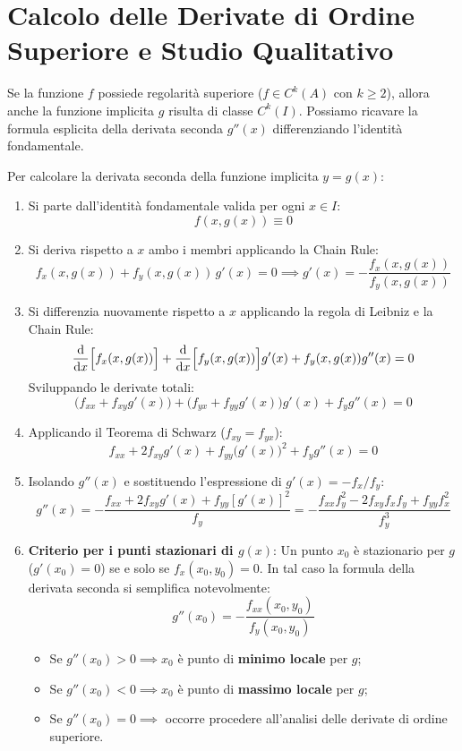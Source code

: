\section{Calcolo delle Derivate di Ordine Superiore e Studio Qualitativo}

Se la funzione $f$ possiede regolarità superiore ($f \in C^k(A)$ con $k \ge 2$), allora anche la funzione implicita $g$ risulta di classe $C^k(I)$. Possiamo ricavare la formula esplicita della derivata seconda $g''(x)$ differenziando l'identità fondamentale.

\begin{metodo}
Per calcolare la derivata seconda della funzione implicita $y = g(x)$:
\begin{enumerate}
    \item Si parte dall'identità fondamentale valida per ogni $x \in I$:
    \[
    f(x, g(x)) \equiv 0
    \]
    \item Si deriva rispetto a $x$ ambo i membri applicando la Chain Rule:
    \[
    f_x(x, g(x)) + f_y(x, g(x)) \, g'(x) = 0 \implies g'(x) = -\frac{f_x(x, g(x))}{f_y(x, g(x))}
    \]
    \item Si differenzia nuovamente rispetto a $x$ applicando la regola di Leibniz e la Chain Rule:
    \[
    \frac{\mathop{}\!\mathrm{d} }{\mathop{}\!\mathrm{d} x} \Big[ f_x(x, g(x)) \Big] + \frac{\mathop{}\!\mathrm{d} }{\mathop{}\!\mathrm{d} x} \Big[ f_y(x, g(x)) \Big] g'(x) + f_y(x, g(x)) g''(x) = 0
    \]
    Sviluppando le derivate totali:
    \[
    \Big( f_{xx} + f_{xy} g'(x) \Big) + \Big( f_{yx} + f_{yy} g'(x) \Big) g'(x) + f_y g''(x) = 0
    \]
    \item Applicando il Teorema di Schwarz ($f_{xy} = f_{yx}$):
    \[
    f_{xx} + 2 f_{xy} g'(x) + f_{yy} \big( g'(x) \big)^2 + f_y g''(x) = 0
    \]
    \item Isolando $g''(x)$ e sostituendo l'espressione di $g'(x) = -f_x / f_y$:
    \[
    g''(x) = -\frac{f_{xx} + 2 f_{xy} g'(x) + f_{yy} [g'(x)]^2}{f_y} = -\frac{f_{xx} f_y^2 - 2 f_{xy} f_x f_y + f_{yy} f_x^2}{f_y^3}
    \]
    \item \textbf{Criterio per i punti stazionari di $g(x)$}:
    Un punto $x_0$ è stazionario per $g$ ($g'(x_0) = 0$) se e solo se $f_x(x_0, y_0) = 0$. In tal caso la formula della derivata seconda si semplifica notevolmente:
    \[
    g''(x_0) = -\frac{f_{xx}(x_0, y_0)}{f_y(x_0, y_0)}
    \]
    \begin{itemize}
        \item Se $g''(x_0) > 0 \implies x_0$ è punto di \textbf{minimo locale} per $g$;
        \item Se $g''(x_0) < 0 \implies x_0$ è punto di \textbf{massimo locale} per $g$;
        \item Se $g''(x_0) = 0 \implies$ occorre procedere all'analisi delle derivate di ordine superiore.
    \end{itemize}
\end{enumerate}
\end{metodo}

